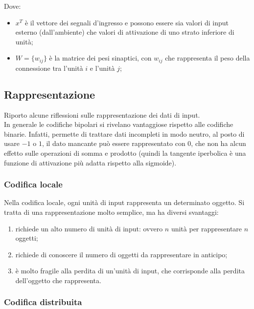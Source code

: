 Dove:
\begin{itemize}
	\item $x^T$ è il vettore dei segnali d'ingresso e possono essere sia valori
	      di input esterno (dall'ambiente) che valori di attivazione di uno
	      strato inferiore di unità;

	\item $W = \{w_{ij}\}$ è la matrice dei pesi sinaptici, con $w_{ij}$ che
	      rappresenta il peso della connessione tra l'unità $i$ e l'unità $j$;
\end{itemize}

\subsection{Rappresentazione}

Riporto alcune riflessioni sulle rappresentazione dei dati di input.\\
In generale le codifiche bipolari si rivelano vantaggiose rispetto alle
codifiche binarie. Infatti, permette di trattare dati incompleti in modo neutro,
al posto di usare $-1$ o $1$, il dato mancante può essere rappresentato con $0$,
che non ha alcun effetto sulle operazioni di somma e prodotto (quindi la
tangente iperbolica è una funzione di attivazione più adatta rispetto alla
sigmoide).\\

\subsubsection{Codifica locale}

Nella codifica locale, ogni unità di input rappresenta un determinato oggetto.
Si tratta di una rappresentazione molto semplice, ma ha diversi svantaggi:
\begin{enumerate}
	\item richiede un alto numero di unità di input: ovvero $n$ unità per
	      rappresentare $n$ oggetti;

	\item richiede di conoscere il numero di oggetti da rappresentare in
	      anticipo;

	\item è molto fragile alla perdita di un'unità di input, che corrisponde
	      alla perdita dell'oggetto che rappresenta.
\end{enumerate}

\subsubsection{Codifica distribuita}

